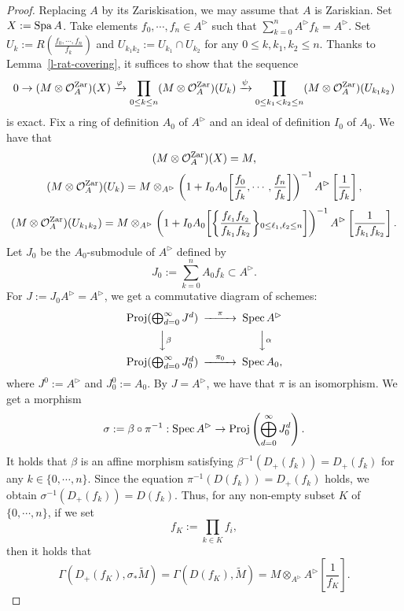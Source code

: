\begin{proof}
Replacing $A$ by its Zariskisation, 
we may assume that $A$ is Zariskian. 
Set $X:={\operatorname{Spa}}\,A$. 
Take elements $f_0, \cdots, f_n \in A^{\rhd}$ such that 
$\sum_{k=0}^n A^{\rhd} f_k=A^{\rhd}$. 
Set $U_k:=R\left(\frac{f_0, \cdots, f_n}{f_k}\right)$ and 
$U_{k_1k_2} :=U_{k_1} \cap U_{k_2}$ for any $0 \leq k, k_1, k_2 \leq n$. 
Thanks to Lemma~\ref{l-rat-covering}, 
it suffices to show that the sequence 
{\small
\begin{equation}\label{e-sheafy}
0 \to (M \otimes \mathcal{O}_A^{{\operatorname{Zar}}})(X) \xrightarrow{\varphi} \prod_{0\leq k \leq n} (M \otimes \mathcal{O}_A^{{\operatorname{Zar}}})(U_k) 
\xrightarrow{\psi} \prod_{0\leq k_1<k_2 \leq n} (M \otimes \mathcal{O}_A^{{\operatorname{Zar}}})(U_{k_1k_2})
\end{equation}
}
is exact. 
Fix a ring of definition $A_0$ of $A^{\rhd}$ and 
an ideal of definition $I_0$ of $A_0$.
We have that 
$$(M \otimes \mathcal{O}_A^{{\operatorname{Zar}}})(X)=M,$$
$$(M \otimes \mathcal{O}_A^{{\operatorname{Zar}}})(U_k)
=M \otimes_{A^{\rhd}} \left(1+I_0A_0\middle[\frac{f_0}{f_k}, \cdots, \frac{f_n}{f_k}\middle]\right)^{-1}A^{\rhd}\left[\frac{1}{f_k}\right],$$
$$(M \otimes \mathcal{O}_A^{{\operatorname{Zar}}})(U_{k_1k_2})=M \otimes_{A^{\rhd}}
\left(1+I_0A_0\middle[\middle\{\frac{f_{\ell_1}f_{\ell_2}}{f_{k_1}f_{k_2}}\middle\}_{0 \leq \ell_1, \ell_2 \leq n}\middle]\right)^{-1}A^{\rhd}\left[\frac{1}{f_{k_1}f_{k_2}}\right].$$
Let $J_0$ be the $A_0$-submodule of $A^{\rhd}$ defined by 
$$J_0:=\sum_{k=0}^n A_0f_k \subset A^{\rhd}.$$
For $J:=J_0A^{\rhd}=A^{\rhd}$, we get a commutative diagram of schemes: 
$$\begin{CD}
\Proj(\bigoplus_{d=0}^{\infty} J^d) @>\pi >> \Spec\,A^{\rhd}\\
@VV\beta V @VV\alpha V\\
\Proj(\bigoplus_{d=0}^{\infty} J_0^d) @>\pi_0>> \Spec\,A_0,
\end{CD}$$
where $J^0:=A^{\rhd}$ and $J_0^0:=A_0$. 
By $J=A^{\rhd}$, we have that $\pi$ is an isomorphism. 
We get a morphism 
$$\sigma:=\beta \circ \pi^{-1}:{\operatorname{Spec}}\,A^{\rhd} \to 
{\operatorname{Proj}}\left(\bigoplus_{d=0}^{\infty} J_0^d\right).$$
It holds that $\beta$ is an affine morphism satisfying $\beta^{-1}(D_+(f_k))=D_+(f_k)$ for any $k \in \{0, \cdots, n\}$. 
Since the equation $\pi^{-1}(D(f_k))=D_+(f_k)$ holds, 
we obtain $\sigma^{-1}(D_+(f_k))=D(f_k)$. 
Thus, for any non-empty subset $K$ of $\{0, \cdots, n\}$, 
if we set 
$$f_K:=\prod_{k \in K} f_i,$$ 
then it holds that  
\begin{equation}\label{e-sheafy2}
\Gamma(D_+\left(f_K\right), \sigma_*\widetilde M)=
\Gamma(D\left(f_K\right), \widetilde M)=M \otimes_{A^{\rhd}} A^{\rhd}\left[\frac{1}{f_K}\right].
\end{equation}




\end{proof}

